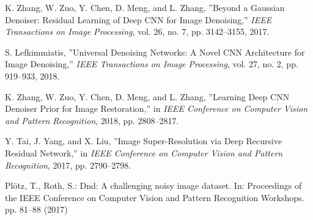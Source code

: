 \documentclass[a4paper,
               ]{jacow}
\begin{document}
{\begin{thebibliography}{9}
        K. Zhang, W. Zuo, Y. Chen, D. Meng, and L. Zhang,
        ''Beyond a Gaussian Denoiser: Residual Learning of Deep CNN for Image Denoising,''
        \emph{IEEE Transactions on Image Processing}, vol. 26, no. 7, pp. 3142--3155, 2017.

        S. Lefkimmiatis,
        ''Universal Denoising Networks: A Novel CNN Architecture for Image Denoising,''
        \emph{IEEE Transactions on Image Processing}, vol. 27, no. 2, pp. 919--933, 2018.

        K. Zhang, W. Zuo, Y. Chen, D. Meng, and L. Zhang,
        ''Learning Deep CNN Denoiser Prior for Image Restoration,''
        in \emph{IEEE Conference on Computer Vision and Pattern Recognition}, 2018, pp. 2808--2817.

        Y. Tai, J. Yang, and X. Liu,
        ''Image Super-Resolution via Deep Recursive Residual Network,''
        in \emph{IEEE Conference on Computer Vision and Pattern Recognition}, 2017, pp. 2790--2798.

        Plötz, T., Roth, S.: Dnd: A challenging noisy image dataset. In: Proceedings of the IEEE Conference on Computer Vision and Pattern Recognition Workshops. pp. 81–88 (2017)
	\end{thebibliography}
} %
%
%

\end{document}
